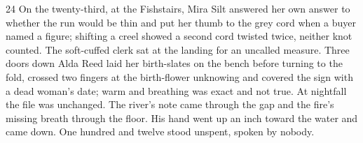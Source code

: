 \begin{CRchronicle}{24}
On the twenty-third, at the Fishstairs, Mira Silt answered her own answer to whether the run would be thin and put her thumb to the grey cord when a buyer named a figure; shifting a creel showed a second cord twisted twice, neither knot counted. The soft-cuffed clerk sat at the landing for an uncalled measure. Three doors down Alda Reed laid her birth-slates on the bench before turning to the fold, crossed two fingers at the birth-flower unknowing and covered the sign with a dead woman’s date; warm and breathing was exact and not true. At nightfall the file was unchanged. The river’s note came through the gap and the fire’s missing breath through the floor. His hand went up an inch toward the water and came down. One hundred and twelve stood unspent, spoken by nobody.
\end{CRchronicle}
